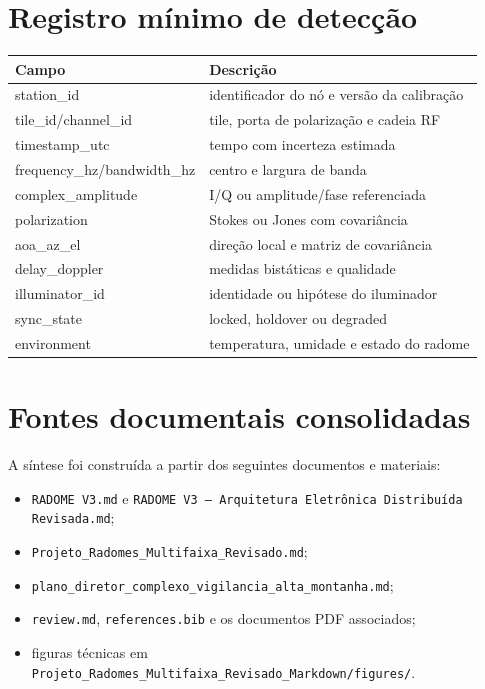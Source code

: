 \documentclass[11pt,a4paper]{report}
\begin{document}
\chapter{Registro mínimo de detecção}
\begin{longtable}{p{}p{}}
\toprule
\textbf{Campo} & \textbf{Descrição}\\
\midrule
station\_id & identificador do nó e versão da calibração\\
tile\_id/channel\_id & tile, porta de polarização e cadeia RF\\
timestamp\_utc & tempo com incerteza estimada\\
frequency\_hz/bandwidth\_hz & centro e largura de banda\\
complex\_amplitude & I/Q ou amplitude/fase referenciada\\
polarization & Stokes ou Jones com covariância\\
aoa\_az\_el & direção local e matriz de covariância\\
delay\_doppler & medidas bistáticas e qualidade\\
illuminator\_id & identidade ou hipótese do iluminador\\
sync\_state & locked, holdover ou degraded\\
environment & temperatura, umidade e estado do radome\\
\bottomrule
\end{longtable}

\chapter{Fontes documentais consolidadas}

A síntese foi construída a partir dos seguintes documentos e materiais:
\begin{itemize}
  \item \texttt{RADOME V3.md} e \texttt{RADOME V3 -- Arquitetura Eletrônica Distribuída Revisada.md};
  \item \texttt{Projeto\_Radomes\_Multifaixa\_Revisado.md};
  \item \texttt{plano\_diretor\_complexo\_vigilancia\_alta\_montanha.md};
  \item \texttt{review.md}, \texttt{references.bib} e os documentos PDF associados;
  \item figuras técnicas em \texttt{Projeto\_Radomes\_Multifaixa\_Revisado\_Markdown/figures/}.
\end{itemize}



\end{document}
